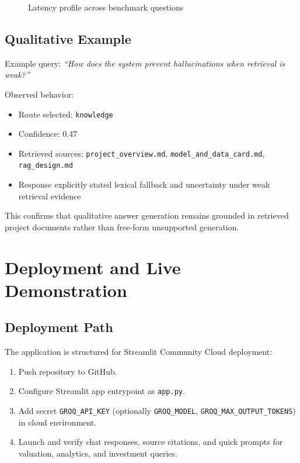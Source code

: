 \documentclass[12pt,a4paper]{article}
\begin{document}
\begin{figure}[H]
\centering
{}
\caption{Latency profile across benchmark questions}
\label{fig:latency}
\end{figure}

\subsection{Qualitative Example}
Example query: \emph{``How does the system prevent hallucinations when retrieval is weak?''}

Observed behavior:
\begin{itemize}[leftmargin=1.6em]
  \item Route selected: \texttt{knowledge}
  \item Confidence: 0.47
  \item Retrieved sources: \texttt{project\_overview.md}, \texttt{model\_and\_data\_card.md}, \texttt{rag\_design.md}
  \item Response explicitly stated lexical fallback and uncertainty under weak retrieval evidence
\end{itemize}

This confirms that qualitative answer generation remains grounded in retrieved project documents rather than free-form unsupported generation.

\section{Deployment and Live Demonstration}
\subsection{Deployment Path}
The application is structured for Streamlit Community Cloud deployment:
\begin{enumerate}[leftmargin=1.8em]
  \item Push repository to GitHub.
  \item Configure Streamlit app entrypoint as \texttt{app.py}.
  \item Add secret \texttt{GROQ\_API\_KEY} (optionally \texttt{GROQ\_MODEL}, \texttt{GROQ\_MAX\_OUTPUT\_TOKENS}) in cloud environment.
  \item Launch and verify chat responses, source citations, and quick prompts for valuation, analytics, and investment queries.
\end{enumerate}
\end{document}
